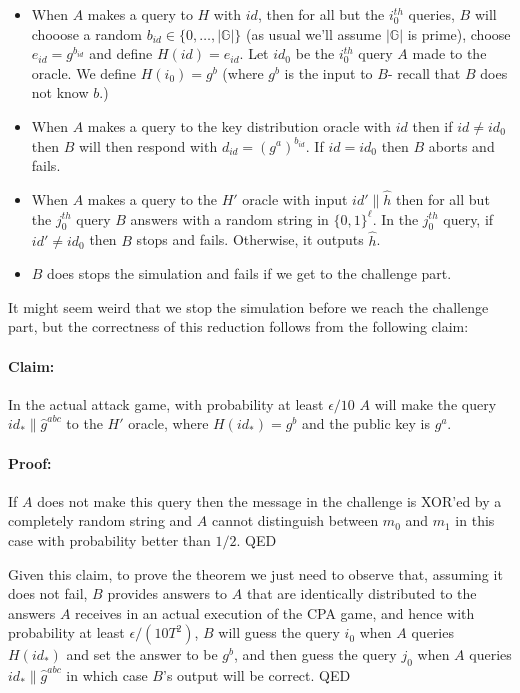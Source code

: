 \begin{itemize}
\item
  When \(A\) makes a query to \(H\) with \(id\), then for all but the
  \(i_0^{th}\) queries, \(B\) will chooose a random
  \(b_{id} \in \{0,\ldots, |\mathbb{G}|\}\) (as usual we'll assume
  \(|\mathbb{G}|\) is prime), choose \(e_{id}=g^{b_{id}}\) and define
  \(H(id)=e_{id}\). Let \(id_0\) be the \(i_0^{th}\) query \(A\) made to
  the oracle. We define \(H(i_0)=g^b\) (where \(g^b\) is the input to
  \(B\)- recall that \(B\) does not know \(b\).)
\item
  When \(A\) makes a query to the key distribution oracle with \(id\)
  then if \(id\neq id_0\) then \(B\) will then respond with
  \(d_{id}=(g^a)^{b_{id}}\). If \(id = id_0\) then \(B\) aborts and
  fails.
\item
  When \(A\) makes a query to the \(H'\) oracle with input
  \(id'\|\hat{h}\) then for all but the \(j_0^{th}\) query \(B\) answers
  with a random string in \(\{0,1\}^\ell\). In the \(j_0^{th}\) query,
  if \(id' \neq id_0\) then \(B\) stops and fails. Otherwise, it outputs
  \(\hat{h}\).
\item
  \(B\) does stops the simulation and fails if we get to the challenge
  part.
\end{itemize}

It might seem weird that we stop the simulation before we reach the
challenge part, but the correctness of this reduction follows from the
following claim:

\paragraph{Claim:} In the actual attack game, with probability at least
\(\epsilon/10\) \(A\) will make the query \(id_*\| \hat{g}^{abc}\) to
the \(H'\) oracle, where \(H(id_*)=g^b\) and the public key is \(g^a\).

\paragraph{Proof:} If \(A\) does not make this query then the message in
the challenge is XOR'ed by a completely random string and \(A\) cannot
distinguish between \(m_0\) and \(m_1\) in this case with probability
better than \(1/2\). QED

Given this claim, to prove the theorem we just need to observe that,
assuming it does not fail, \(B\) provides answers to \(A\) that are
identically distributed to the answers \(A\) receives in an actual
execution of the CPA game, and hence with probability at least
\(\epsilon/(10T^2)\), \(B\) will guess the query \(i_0\) when \(A\)
queries \(H(id_*)\) and set the answer to be \(g^b\), and then guess the
query \(j_0\) when \(A\) queries \(id_*\|\hat{g}^{abc}\) in which case
\(B\)'s output will be correct. QED

